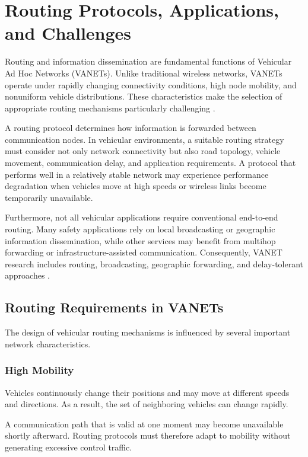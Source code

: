 
\section{Routing Protocols, Applications, and Challenges}
\label{sec:3}

Routing and information dissemination are fundamental
functions of Vehicular Ad Hoc Networks (VANETs).
Unlike traditional wireless networks, VANETs operate
under rapidly changing connectivity conditions,
high node mobility, and nonuniform vehicle
distributions. These characteristics make the
selection of appropriate routing mechanisms
particularly challenging \cite{Hartenstein2008,Zeadally2012}.

A routing protocol determines how information
is forwarded between communication nodes.
In vehicular environments, a suitable routing
strategy must consider not only network
connectivity but also road topology, vehicle
movement, communication delay, and application
requirements. A protocol that performs well
in a relatively stable network may experience
performance degradation when vehicles move
at high speeds or wireless links become
temporarily unavailable.

Furthermore, not all vehicular applications
require conventional end-to-end routing.
Many safety applications rely on local
broadcasting or geographic information
dissemination, while other services may
benefit from multihop forwarding or
infrastructure-assisted communication.
Consequently, VANET research includes
routing, broadcasting, geographic
forwarding, and delay-tolerant approaches
\cite{Karagiannis2011}.

\subsection{Routing Requirements in VANETs}
\label{sec:3A}

The design of vehicular routing mechanisms
is influenced by several important
network characteristics.

\subsubsection{High Mobility}

Vehicles continuously change their positions
and may move at different speeds and
directions. As a result, the set of
neighboring vehicles can change rapidly.

A communication path that is valid
at one moment may become unavailable
shortly afterward. Routing protocols
must therefore adapt to mobility
without generating excessive
control traffic.

